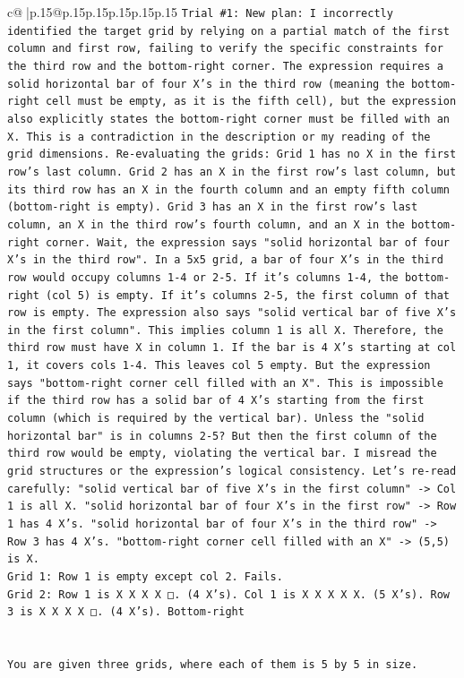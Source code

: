 \documentclass{article}
\begin{document}
{\begin{supertabular}{c@{$\;$}|p{.15\linewidth}@{}p{.15\linewidth}p{.15\linewidth}p{.15\linewidth}p{.15\linewidth}p{.15\linewidth}}
{{{\texttt{Trial \#1: New plan: I incorrectly identified the target grid by relying on a partial match of the first column and first row, failing to verify the specific constraints for the third row and the bottom{-}right corner. The expression requires a solid horizontal bar of four X's in the third row (meaning the bottom{-}right cell must be empty, as it is the fifth cell), but the expression also explicitly states the bottom{-}right corner must be filled with an X. This is a contradiction in the description or my reading of the grid dimensions. Re{-}evaluating the grids: Grid 1 has no X in the first row's last column. Grid 2 has an X in the first row's last column, but its third row has an X in the fourth column and an empty fifth column (bottom{-}right is empty). Grid 3 has an X in the first row's last column, an X in the third row's fourth column, and an X in the bottom{-}right corner. Wait, the expression says "solid horizontal bar of four X's in the third row". In a 5x5 grid, a bar of four X's in the third row would occupy columns 1{-}4 or 2{-}5. If it's columns 1{-}4, the bottom{-}right (col 5) is empty. If it's columns 2{-}5, the first column of that row is empty. The expression also says "solid vertical bar of five X's in the first column". This implies column 1 is all X. Therefore, the third row must have X in column 1. If the bar is 4 X's starting at col 1, it covers cols 1{-}4. This leaves col 5 empty. But the expression says "bottom{-}right corner cell filled with an X". This is impossible if the third row has a solid bar of 4 X's starting from the first column (which is required by the vertical bar). Unless the "solid horizontal bar" is in columns 2{-}5? But then the first column of the third row would be empty, violating the vertical bar. I misread the grid structures or the expression's logical consistency. Let's re{-}read carefully: "solid vertical bar of five X's in the first column" {-}> Col 1 is all X. "solid horizontal bar of four X's in the first row" {-}> Row 1 has 4 X's. "solid horizontal bar of four X's in the third row" {-}> Row 3 has 4 X's. "bottom{-}right corner cell filled with an X" {-}> (5,5) is X.} \\
\texttt{Grid 1: Row 1 is empty except col 2. Fails.} \\
\texttt{Grid 2: Row 1 is X X X X □. (4 X's). Col 1 is X X X X X. (5 X's). Row 3 is X X X X □. (4 X's). Bottom{-}right} \\
\\ 
\\ 
\texttt{You are given three grids, where each of them is 5 by 5 in size.} \\
}}}
\end{supertabular}}
\end{document}
